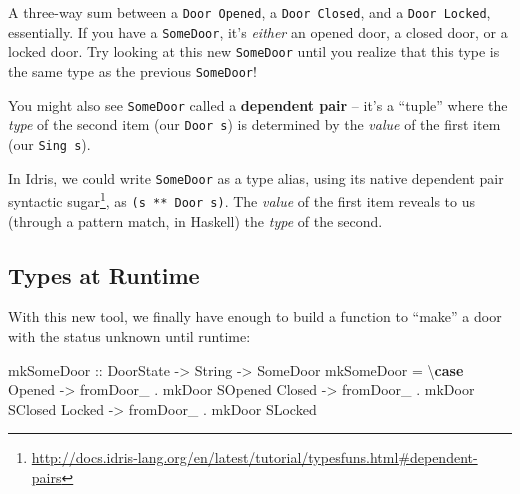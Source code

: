 \documentclass[]{article}
\newenvironment{Shaded}{}{}
\newcommand{\DataTypeTok}[1]{\textcolor[rgb]{0.56,0.13,0.00}{#1}}
\newcommand{\KeywordTok}[1]{\textcolor[rgb]{0.00,0.44,0.13}{\textbf{#1}}}
\newcommand{\NormalTok}[1]{#1}
\newcommand{\OperatorTok}[1]{\textcolor[rgb]{0.40,0.40,0.40}{#1}}
\newcommand{\OtherTok}[1]{\textcolor[rgb]{0.00,0.44,0.13}{#1}}
\renewcommand{\href}[2]{#2\footnote{\url{#1}}}
\begin{document}
A three-way sum between a \texttt{Door\ \textquotesingle{}Opened}, a
\texttt{Door\ \textquotesingle{}Closed}, and a
\texttt{Door\ \textquotesingle{}Locked}, essentially. If you have a
\texttt{SomeDoor}, it's \emph{either} an opened door, a closed door, or a locked
door. Try looking at this new \texttt{SomeDoor} until you realize that this type
is the same type as the previous \texttt{SomeDoor}!

You might also see \texttt{SomeDoor} called a \textbf{dependent pair} -- it's a
``tuple'' where the \emph{type} of the second item (our \texttt{Door\ s}) is
determined by the \emph{value} of the first item (our \texttt{Sing\ s}).

In Idris, we could write \texttt{SomeDoor} as a type alias, using its native
\href{http://docs.idris-lang.org/en/latest/tutorial/typesfuns.html\#dependent-pairs}{dependent
pair syntactic sugar}, as \texttt{(s\ **\ Door\ s)}. The \emph{value} of the
first item reveals to us (through a pattern match, in Haskell) the \emph{type}
of the second.

\hypertarget{types-at-runtime}{%
\subsection{Types at Runtime}\label{types-at-runtime}}

With this new tool, we finally have enough to build a function to ``make'' a
door with the status unknown until runtime:

\begin{Shaded}
\begin{Highlighting}[]
\OtherTok{mkSomeDoor ::} \DataTypeTok{DoorState} \OtherTok{{-}>} \DataTypeTok{String} \OtherTok{{-}>} \DataTypeTok{SomeDoor}
\NormalTok{mkSomeDoor }\OtherTok{=}\NormalTok{ \textbackslash{}}\KeywordTok{case}
    \DataTypeTok{Opened} \OtherTok{{-}>}\NormalTok{ fromDoor\_ }\OperatorTok{.}\NormalTok{ mkDoor }\DataTypeTok{SOpened}
    \DataTypeTok{Closed} \OtherTok{{-}>}\NormalTok{ fromDoor\_ }\OperatorTok{.}\NormalTok{ mkDoor }\DataTypeTok{SClosed}
    \DataTypeTok{Locked} \OtherTok{{-}>}\NormalTok{ fromDoor\_ }\OperatorTok{.}\NormalTok{ mkDoor }\DataTypeTok{SLocked}
\end{Highlighting}
\end{Shaded}
\end{document}
